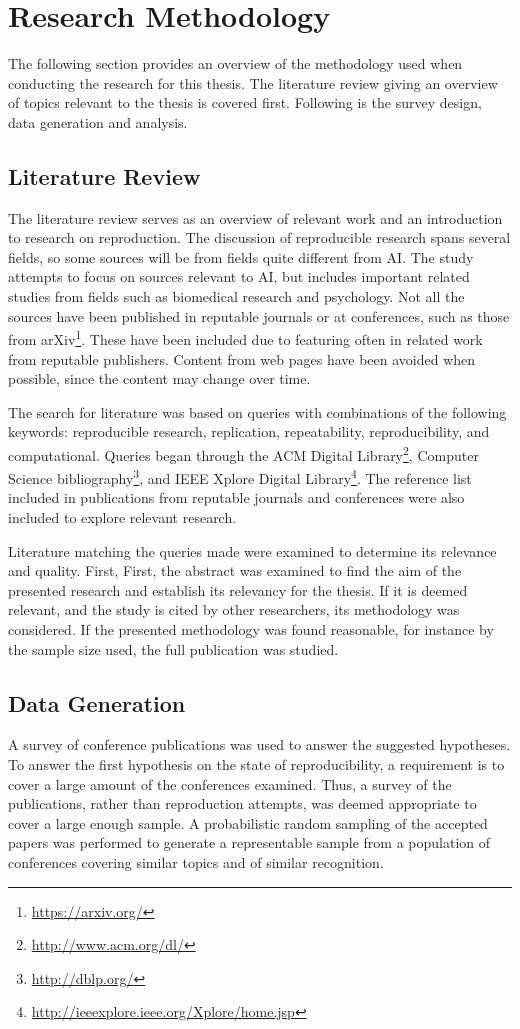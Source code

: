 \section{Research Methodology}
The following section provides an overview of the methodology used when conducting the research for this thesis. The literature review giving an overview of topics relevant to the thesis is covered first. Following is the survey design, data generation and analysis.

\subsection{Literature Review}
The literature review serves as an overview of relevant work and an introduction to research on reproduction. The discussion of reproducible research spans several fields, so some sources will be from fields quite different from AI. The study attempts to focus on sources relevant to AI, but includes important related studies from fields such as biomedical research and psychology. Not all the sources have been published in reputable journals or at conferences, such as those from arXiv\footnote{\url{https://arxiv.org/}}. These have been included due to featuring often in related work from reputable publishers. Content from web pages have been avoided when possible, since the content may change over time.

The search for literature was based on queries with combinations of the following keywords: reproducible research, replication, repeatability, reproducibility, and computational. Queries began through the ACM Digital Library\footnote{\url{http://www.acm.org/dl/}}, Computer Science bibliography\footnote{\url{http://dblp.org/}}, and IEEE Xplore Digital Library\footnote{\url{http://ieeexplore.ieee.org/Xplore/home.jsp}}. The reference list included in publications from reputable journals and conferences were also included to explore relevant research.

Literature matching the queries made were examined to determine its relevance and quality. First, First, the abstract was examined to find the aim of the presented research and establish its relevancy for the thesis. If it is deemed relevant, and the study is cited by other researchers, its methodology was considered. If the presented methodology was found reasonable, for instance by the sample size used, the full publication was studied.

\subsection{Data Generation}
A survey of conference publications was used to answer the suggested hypotheses. To answer the first hypothesis on the state of reproducibility, a requirement is to cover a large amount of the conferences examined. Thus, a survey of the publications, rather than reproduction attempts, was deemed appropriate to cover a large enough sample. A probabilistic random sampling of the accepted papers was performed to generate a representable sample from a population of conferences covering similar topics and of similar recognition.

